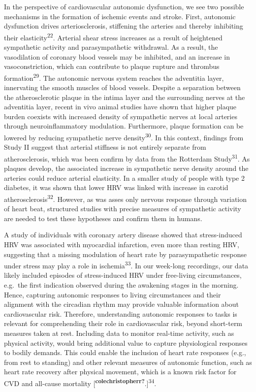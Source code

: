 \documentclass[
  a4paper,
  headsepline=true,
  open=any]{scrbook}
\begin{document}
In the perspective of cardiovascular autonomic dysfunction, we see two
possible mechanisms in the formation of ischemic events and stroke.
First, autonomic dysfunction drives arteriosclerosis, stiffening the
arteries and thereby inhibiting their elasticity\textsuperscript{22}.
Arterial shear stress increases as a result of heightened sympathetic
activity and parasympathetic withdrawal. As a result, the vasodilation
of coronary blood vessels may be inhibited, and an increase in
vasoconstriction, which can contribute to plaque rupture and thrombus
formation\textsuperscript{29}. The autonomic nervous system reaches the
adventitia layer, innervating the smooth muscles of blood vessels.
Despite a separation between the atherosclerotic plaque in the intima
layer and the surrounding nerves at the adventitia layer, recent in vivo
animal studies have shown that higher plaque burden coexists with
increased density of sympathetic nerves at local arteries through
neuroinflammatory modulation. Furthermore, plaque formation can be
lowered by reducing sympathetic nerve density\textsuperscript{30}. In
this context, findings from Study II suggest that arterial stiffness is
not entirely separate from atherosclerosis, which was been confirm by
data from the Rotterdam Study\textsuperscript{31}. As plaques develop,
the associated increase in sympathetic nerve density around the arteries
could reduce arterial elasticity. In a smaller study of people with type
2 diabetes, it was shown that lower HRV was linked with increase in
carotid atherosclerosis\textsuperscript{32}. However, as was asses only
nervous response through variation of heart beat, structured studies
with precise measures of sympathetic activity are needed to test these
hypotheses and confirm them in humans.

A study of individuals with coronary artery disease showed that
stress-induced HRV was associated with myocardial infarction, even more
than resting HRV, suggesting that a missing modulation of heart rate by
parasympathetic response under stress may play a role in
ischemia\textsuperscript{33}. In our week-long recordings, our data
likely included episodes of stress-induced HRV under free-living
circumstances, e.g.~the first indication observed during the awakening
stages in the morning. Hence, capturing autonomic responses to living
circumstances and their alignment with the circadian rhythm may provide
valuable information about cardiovascular risk. Therefore, understanding
autonomic responses to tasks is relevant for comprehending their role in
cardiovascular risk, beyond short-term measures taken at rest. Including
data to monitor real-time activity, such as physical activity, would
bring additional value to capture physiological responses to bodily
demands. This could enable the inclusion of heart rate responses (e.g.,
from rest to standing) and other relevant measures of autonomic
function, such as heart rate recovery after physical movement, which is
a known risk factor for CVD and all-cause mortality
{[}\textsuperscript{\textbf{colechristopherr?}}.{]}\textsuperscript{34}.
\end{document}

